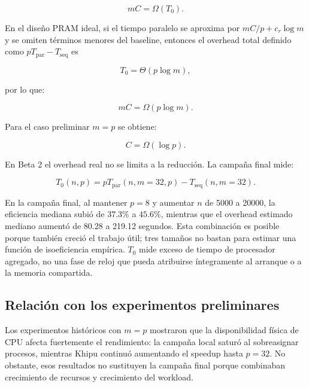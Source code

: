 \documentclass[11pt,a4paper]{article}
\newcommand{\Cost}{C}
\begin{document}
\begin{equation}
    m\Cost
    =
    \Omega(T_0).
    \label{eq:iso-general}
\end{equation}

En el diseño PRAM ideal, si el tiempo paralelo se aproxima por
$m\Cost/p+c_r\log m$ y se omiten términos menores del baseline, entonces el
overhead total definido como $pT_{\mathrm{par}}-T_{\mathrm{seq}}$ es

\begin{equation}
    T_0=\Theta(p\log m),
\end{equation}

por lo que:

\begin{equation}
    m\Cost
    =
    \Omega(p\log m).
\end{equation}

Para el caso preliminar $m=p$ se obtiene:

\begin{equation}
    \Cost
    =
    \Omega(\log p).
\end{equation}

En Beta 2 el overhead real no se limita a la reducción. La campaña final mide:

\begin{equation}
    T_0(n,p)
    =
    pT_{\mathrm{par}}(n,m=32,p)
    -
    T_{\mathrm{seq}}(n,m=32).
\end{equation}

En la campaña final, al mantener $p=8$ y aumentar $n$ de 5000 a 20000,
la eficiencia mediana subió de $37.3\%$ a $45.6\%$, mientras que el overhead
estimado mediano aumentó de 80.28 a 219.12 segundos. Esta combinación es
posible porque también creció el trabajo útil; tres tamaños no bastan para
estimar una función de isoeficiencia empírica. $T_0$ mide exceso de
tiempo de procesador agregado, no una fase de reloj que pueda atribuirse
íntegramente al arranque o a la memoria compartida.

\subsection{Relación con los experimentos preliminares}

Los experimentos históricos con $m=p$ mostraron que la disponibilidad física de CPU
afecta fuertemente el rendimiento: la campaña local saturó al sobreasignar procesos,
mientras Khipu continuó aumentando el speedup hasta $p=32$. No obstante, esos resultados
no sustituyen la campaña final porque combinaban crecimiento de recursos y crecimiento
del workload.
\end{document}
